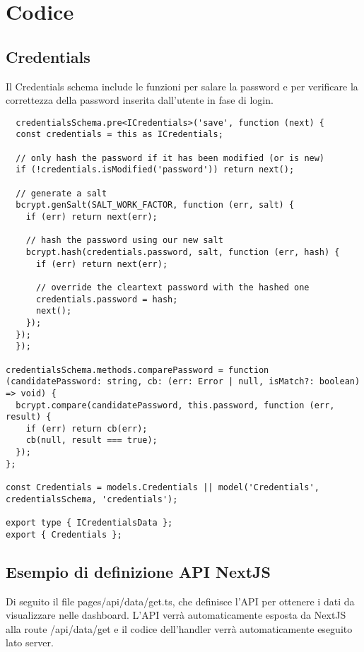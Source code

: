\section*{Codice}

\subsection*{Credentials}
Il Credentials schema include le funzioni per salare la password e per verificare la correttezza della password inserita dall'utente in fase di login.
\begin{verbatim}
  credentialsSchema.pre<ICredentials>('save', function (next) {
  const credentials = this as ICredentials;

  // only hash the password if it has been modified (or is new)
  if (!credentials.isModified('password')) return next();

  // generate a salt
  bcrypt.genSalt(SALT_WORK_FACTOR, function (err, salt) {
    if (err) return next(err);

    // hash the password using our new salt
    bcrypt.hash(credentials.password, salt, function (err, hash) {
      if (err) return next(err);

      // override the cleartext password with the hashed one
      credentials.password = hash;
      next();
    });
  });
  });

credentialsSchema.methods.comparePassword = function (candidatePassword: string, cb: (err: Error | null, isMatch?: boolean) => void) {
  bcrypt.compare(candidatePassword, this.password, function (err, result) {
    if (err) return cb(err);
    cb(null, result === true);
  });
};

const Credentials = models.Credentials || model('Credentials', credentialsSchema, 'credentials');

export type { ICredentialsData };
export { Credentials };

\end{verbatim}


\subsection*{Esempio di definizione API NextJS}
Di seguito il file pages/api/data/get.ts, che definisce l'API per ottenere i dati da visualizzare nelle dashboard. L'API verrà automaticamente esposta da NextJS alla route /api/data/get e il codice dell'handler verrà automaticamente eseguito lato server.

